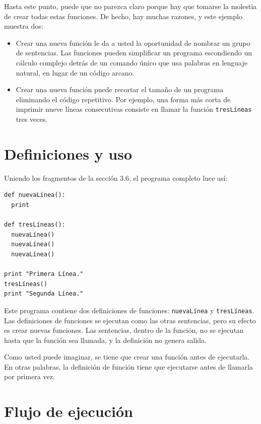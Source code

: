 Hasta este punto, puede que no parezca claro porque hay que tomarse la molestia
de crear todas estas funciones. De hecho, hay muchas razones, y este ejemplo 
muestra dos:

\begin{itemize}

\item Crear una nueva función le da a usted la oportunidad de nombrar un
grupo de sentencias. Las funciones pueden simplificar un programa escondiendo
un cálculo complejo detrás de un comando único que usa palabras en lenguaje
natural, en lugar de un código arcano.

\item Crear una nueva función puede recortar el tamaño de un programa eliminando
el código repetitivo. Por ejemplo, una forma más corta de imprimir nueve
líneas consecutivas consiste en llamar la función \texttt{tresLíneas} tres veces.

\end{itemize}



\section{Definiciones y uso}

Uniendo los fragmentos de la sección 3.6, el programa completo luce así:

\beforeverb
\begin{verbatim}
def nuevaLínea():
  print

def tresLíneas():
  nuevaLínea()
  nuevaLínea()
  nuevaLínea()

print "Primera Línea."
tresLíneas()
print "Segunda Línea."
\end{verbatim}
\afterverb
%
Este programa contiene dos definiciones de funciones: \texttt{nuevaLínea} y
\texttt{tresLíneas}.  Las definiciones de funciones se ejecutan como 
las otras sentencias, pero su efecto es crear nuevas funciones. Las
sentencias, dentro de la función, no se ejecutan hasta que la función
sea llamada, y la definición no genera salida.

Como usted puede imaginar, se tiene que crear una función antes de
ejecutarla. En otras palabras, la definición de función tiene que
ejecutarse antes de llamarla por primera vez.



\section{Flujo de ejecución}

